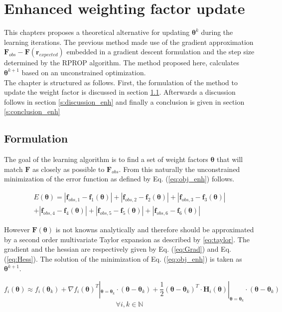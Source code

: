 \chapter{Enhanced weighting factor update}
\label{cha:Enhancement}

This chapters proposes a theoretical alternative for updating $\bm{\theta}^k$ during the learning iterations. The previous method made use of the gradient approximation $\bm{F}_{obs} - \bm{F}(\bm{r}_{expected})$ embedded in a gradient descent formulation and the step size determined by the RPROP algorithm. The method proposed here, calculates $\bm{\theta}^{k+1}$ based on an unconstrained optimization.\\

The chapter is structured as follows. First, the formulation of the method to update the weight factor is discussed in section \ref{s:formulation_enh}. Afterwards a discussion follows in section \ref{s:discussion_enh} and finally a conclusion is given in section \ref{s:conclusion_enh}
\section{Formulation}\label{s:formulation_enh}
The goal of the learning algorithm is to find a set of weight factors $\bm{\theta}$ that will match $\bm{F}$ as closely as possible to $\bm{F}_{obs}$. From this naturally the unconstrained minimization of the error function as defined by Eq. (\ref{eq:obj_enh}) follows.

\begin{multline}\label{eq:obj_enh}
E(\bm{\theta}) = |\bm{f}_{obs,1} - \bm{f}_1(\bm{\theta})|+|\bm{f}_{obs,2} - \bm{f}_2(\bm{\theta})|+|\bm{f}_{obs,3} - \bm{f}_3(\bm{\theta})|\\
+|\bm{f}_{obs,4} - \bm{f}_4(\bm{\theta})|+|\bm{f}_{obs,5} - \bm{f}_5(\bm{\theta})|+|\bm{f}_{obs,6} - \bm{f}_6(\bm{\theta})|
\end{multline}

However $\bm{F}(\bm{\theta})$ is not knowns analytically and therefore should be approximated by a second order multivariate Taylor expansion as described by \ref{eq:taylor}. The gradient and the hessian are respectively given by Eq. (\ref{eq:Grad}) and Eq. (\ref{eq:Hess}). The solution of the minimization of Eq. (\ref{eq:obj_enh}) is taken as $\bm{\theta}^{k+1}$.

\begin{equation}\label{eq:taylor}
	f_i({\bm{\theta}}) \approx f_i(\bm{\theta}_k) + \nabla f_i(\bm{\theta})^T|_{\bm{\theta} = \bm{\theta}_k}\cdot (\bm{\theta} - \bm{\theta}_k) + \frac{1}{2}(\bm{\theta} - \bm{\theta}_k)^T\cdot \bm{H}_i(\bm{\theta})|_{\bm{\theta} = \bm{\theta}_k}\cdot(\bm{\theta} - \bm{\theta}_k)
\end{equation}
\[\forall i,k \in \mathbb{N}\]

